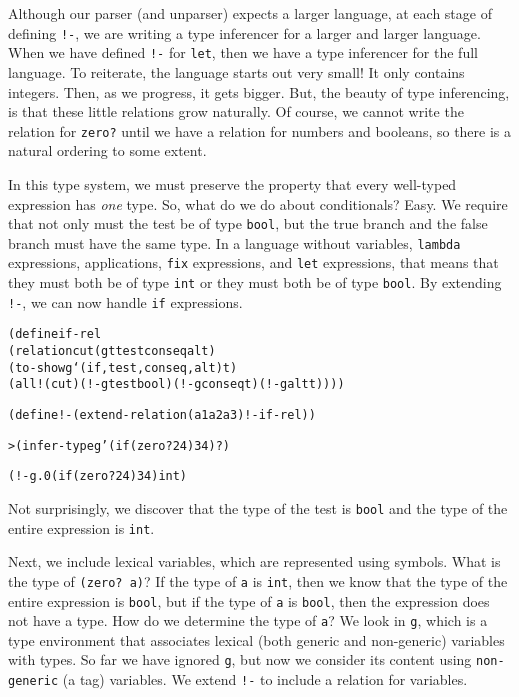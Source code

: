 Although our parser (and unparser) expects a larger language, at each
stage of defining \texttt{!-}, we are writing a type inferencer for a
larger and larger language.  When we have defined \texttt{!-} for
\texttt{let}, then we have a type inferencer for the full language.
To reiterate, the language starts out very small! It only contains
integers.  Then, as we progress, it gets bigger.  But, the beauty of
type inferencing, is that these little relations grow naturally.  Of
course, we cannot write the relation for \texttt{zero?}  until we have
a relation for numbers and booleans, so there is a natural ordering to
some extent.

In this type system, we must preserve the property that every
well-typed expression has \emph{one} type.  So, what do we do about
conditionals?  Easy.  We require that not only must the test be of
type \texttt{bool}, but the true branch and the false branch must
have the same type.  In a language without variables, \texttt{lambda}
expressions, applications, \texttt{fix} expressions, and \texttt{let}
expressions, that means that they must both be of type \texttt{int}
or they must both be of type \texttt{bool}.  By extending
\texttt{!-}, we can now handle \texttt{if} expressions.

\begin{alltt}
(define if-rel
  (relation cut (g t test conseq alt)
    (to-show g `(if ,test ,conseq ,alt) t)
    (all! (cut) (!- g test bool) (!- g conseq t) (!- g alt t))))
\end{alltt}

\begin{alltt}
(define !- (extend-relation (a1 a2 a3) !- if-rel))
\end{alltt}

\begin{alltt}
> (infer-type g '(if (zero? 24) 3 4) ?)

(!- g.0 (if (zero? 24) 3 4) int)
\end{alltt}

\noindent
Not surprisingly, we discover that the type of the test is \texttt{bool}
and the type of the entire expression is \texttt{int}.

Next, we include lexical variables, which are represented using
symbols.  What is the type of \texttt{(zero? a)}?  If the type of
\texttt{a} is \texttt{int}, then we know that the type of the entire
expression is \texttt{bool}, but if the type of \texttt{a} is
\texttt{bool}, then the expression does not have a type.  How do we
determine the type of \texttt{a}?  We look in \texttt{g}, which is a
type environment that associates lexical (both generic and
non-generic) variables with types.  So far we have ignored \texttt{g},
but now we consider its content using \texttt{non-generic} (a tag)
variables.  We extend \texttt{!-} to include a relation for variables.

